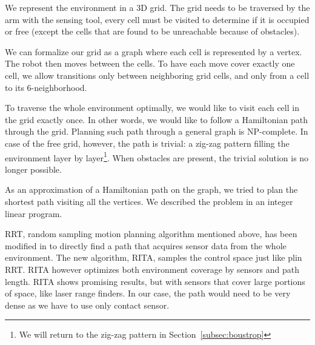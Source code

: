\documentclass[buriama8_dp.tex]{subfiles}
\begin{document}
We represent the environment in a 3D grid. The grid needs to be traversed by the arm with the sensing tool, every cell must be visited to determine if it is occupied or free (except the cells that are found to be unreachable because of obstacles).

We can formalize our grid as a graph where each cell is represented by a vertex. The robot then moves between the cells. To have each move cover exactly one cell, we allow transitions only between neighboring grid cells, and only from a cell to its 6-neighborhood.

To traverse the whole environment optimally, we would like to visit each cell in the grid exactly once. In other words, we would like to follow a Hamiltonian path through the grid. Planning such path through a general graph is NP-complete. In case of the free grid, however, the path is trivial: a zig-zag pattern filling the environment layer by layer\footnote{We will return to the zig-zag pattern in Section~\ref{subsec:boustrop}}. When obstacles are present, the trivial solution is no longer possible.

As an approximation of a Hamiltonian path on the graph, we tried to plan the shortest path visiting all the vertices. We described the problem in an integer linear program.



RRT, random sampling motion planning algorithm mentioned above, has been modified in \cite{rita} to directly find a path that acquires sensor data from the whole environment. The new algorithm, RITA, samples the control space just like plin RRT. RITA however optimizes both environment coverage by sensors and path length. RITA shows promising results, but with sensors that cover large portions of space, like laser range finders. In our case, the path would need to be very dense as we have to use only contact sensor.
\end{document}
